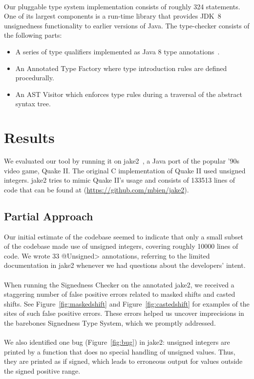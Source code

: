 
\noindent\\
Our pluggable type system implementation consists of roughly 324 statements.
One of its largest components is a run-time library that provides
JDK~8 unsignedness functionality to earlier versions of Java.  The
type-checker consists of the following parts:

\begin{itemize}
  \item A series of type qualifiers implemented as Java 8 type
    annotations~\cite{JSR308-PFD}.
  \item An Annotated Type Factory where type introduction rules are defined procedurally.
  \item An AST Visitor which enforces type rules during a traversal of the
  abstract syntax tree.
\end{itemize}

\newpage
\section{Results} \label{results}
We evaluated our tool by running it on jake2~\cite{Jake2}, a Java
port of the popular '90s video game, Quake II\@.  The original C
implementation of Quake II used unsigned integers. jake2
tries to mimic Quake II's usage and consists of 133513 lines of code that
can be found at (\url{https://github.com/mbien/jake2}).

\subsection{Partial Approach} \label{partial}
Our initial estimate of the codebase seemed to indicate that only a small
subset of the codebase made use of unsigned integers, covering roughly
10000 lines of code. We wrote 33 \<@Unsigned> annotations, referring to the limited
documentation in jake2 whenever we had questions about the developers'
intent.\\
\\
When running the Signedness Checker on the annotated jake2, we received
a staggering number of false positive errors related to masked shifts and
casted shifts. See Figure~\ref{fig:maskedshift} and Figure~\ref{fig:castedshift}
for examples of the sites of such false positive errors. These errors helped us
uncover imprecisions in the barebones Signedness Type System, which we promptly
addressed.\\
\\
We also identified one bug (Figure~\ref{fig:bug}) in jake2:
unsigned integers are printed by a function that does no special handling
of unsigned values.  Thus, they are printed as
if signed, which leads to erroneous output for values outside the signed
positive range.

